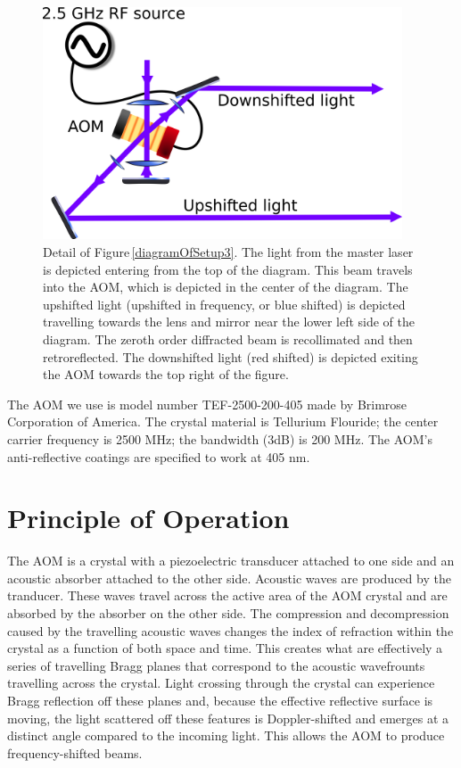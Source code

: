 \begin{figure}
\centerline{
\includegraphics[width=0.95\textwidth]{diagramOfAOM}}
\caption[AOM diagram]{\label{aomDiagramDetail} Detail of Figure\,\ref{diagramOfSetup3}. The light from the master laser is depicted entering from the top of the diagram. This beam travels into the AOM, which is depicted in the center of the diagram. The upshifted light (upshifted in frequency, or blue shifted) is depicted travelling towards the lens and mirror near the lower left side of the diagram. The zeroth order diffracted beam is recollimated and then retroreflected. The downshifted light (red shifted) is depicted exiting the AOM towards the top right of the figure.}
\end{figure}

The AOM we use is model number TEF-2500-200-405 made by Brimrose Corporation of America. The crystal material is Tellurium Flouride; the center carrier frequency is 2500 MHz; the bandwidth (3dB) is 200 MHz. The AOM's anti-reflective coatings are specified to work at 405 nm. 
\section{Principle of Operation}

The AOM is a crystal with a piezoelectric transducer attached to one side and an acoustic absorber attached to the other side. Acoustic waves are produced by the tranducer. These waves travel across the active area of the AOM crystal and are absorbed by the absorber on the other side. The compression and decompression caused by the travelling acoustic waves changes the index of refraction within the crystal as a function of both space and time. This creates what are effectively a series of travelling Bragg planes that correspond to the acoustic wavefrounts travelling across the crystal. Light crossing through the crystal can experience Bragg reflection off these planes and, because the effective reflective surface is moving, the light scattered off these features is Doppler-shifted and emerges at a distinct angle compared to the incoming light. This allows the AOM to produce frequency-shifted beams. 

